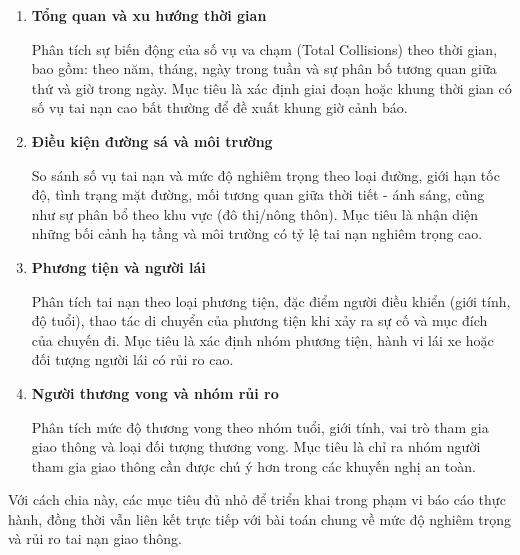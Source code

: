 \begin{enumerate}
    \item \textbf{Tổng quan và xu hướng thời gian}
    
    Phân tích sự biến động của số vụ va chạm (Total Collisions) theo thời gian, bao gồm: theo năm, tháng, ngày trong tuần và sự phân bố tương quan giữa thứ và giờ trong ngày. Mục tiêu là xác định giai đoạn hoặc khung thời gian có số vụ tai nạn cao bất thường để đề xuất khung giờ cảnh báo.

    \item \textbf{Điều kiện đường sá và môi trường}
    
    So sánh số vụ tai nạn và mức độ nghiêm trọng theo loại đường, giới hạn tốc độ, tình trạng mặt đường, mối tương quan giữa thời tiết - ánh sáng, cũng như sự phân bổ theo khu vực (đô thị/nông thôn). Mục tiêu là nhận diện những bối cảnh hạ tầng và môi trường có tỷ lệ tai nạn nghiêm trọng cao.

    \item \textbf{Phương tiện và người lái}
    
    Phân tích tai nạn theo loại phương tiện, đặc điểm người điều khiển (giới tính, độ tuổi), thao tác di chuyển của phương tiện khi xảy ra sự cố và mục đích của chuyến đi. Mục tiêu là xác định nhóm phương tiện, hành vi lái xe hoặc đối tượng người lái có rủi ro cao.

    \item \textbf{Người thương vong và nhóm rủi ro}
    
    Phân tích mức độ thương vong theo nhóm tuổi, giới tính, vai trò tham gia giao thông và loại đối tượng thương vong. Mục tiêu là chỉ ra nhóm người tham gia giao thông cần được chú ý hơn trong các khuyến nghị an toàn.
\end{enumerate}

Với cách chia này, các mục tiêu đủ nhỏ để triển khai trong phạm vi báo cáo thực hành, đồng thời vẫn liên kết trực tiếp với bài toán chung về mức độ nghiêm trọng và rủi ro tai nạn giao thông.
